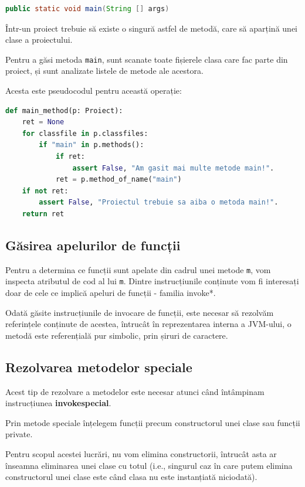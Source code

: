 \begin{lstlisting}[language=Java]
public static void main(String [] args)
\end{lstlisting}

Într-un proiect trebuie să existe o singură astfel de metodă, care să aparțină
unei clase a proiectului.

Pentru a găsi metoda \texttt{main}, sunt scanate toate fișierele
clasa care fac parte din proiect, și sunt analizate listele de
metode ale acestora.

Acesta este pseudocodul pentru această operație:
\begin{lstlisting}[language=Python, label=main_method]
def main_method(p: Proiect):
    ret = None
    for classfile in p.classfiles:
        if "main" in p.methods():
            if ret:
                assert False, "Am gasit mai multe metode main!".
            ret = p.method_of_name("main")
    if not ret:
        assert False, "Proiectul trebuie sa aiba o metoda main!".
    return ret
\end{lstlisting}

\subsection{Găsirea apelurilor de funcții}

Pentru a determina ce funcții sunt apelate din cadrul unei metode \texttt{m},
vom inspecta atributul de cod al lui \texttt{m}.
Dintre instrucțiunile conținute vom fi interesați doar de cele ce implică
apeluri de funcții - familia invoke*.

Odată găsite instrucțiunile de invocare de funcții, este necesar să rezolvăm
referințele conținute de acestea, întrucât în reprezentarea interna a JVM-ului,
o metodă este referențială pur simbolic, prin șiruri de caractere.

\subsection{Rezolvarea metodelor speciale}

Acest tip de rezolvare a metodelor este necesar atunci când întâmpinam
instrucțiunea \textbf{invokespecial}.

Prin metode speciale înțelegem funcții precum constructorul unei clase sau
funcții private.

Pentru scopul acestei lucrări, nu vom elimina constructorii,
întrucât asta ar înseamna eliminarea unei clase cu totul (i.e.,
singurul caz în care putem elimina constructorul unei clase este
când clasa nu este instanțiată niciodată).


